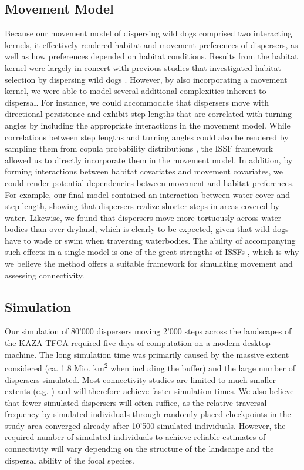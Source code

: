 \documentclass[abstract=on,10pt,a4paper,bibliography=totocnumbered]{article}
\begin{document}
\subsection{Movement Model}
Because our movement model of dispersing wild dogs comprised two interacting
kernels, it effectively rendered habitat and movement preferences of dispersers,
as well as how preferences depended on habitat conditions. Results from the
habitat kernel were largely in concert with previous studies that investigated
habitat selection by dispersing wild dogs \citep{DaviesMostert.2012,
Masenga.2016, Woodroffe.2019, Oneill.2020, Hofmann.2021}. However, by also
incorporating a movement kernel, we were able to model several additional
complexities inherent to dispersal. For instance, we could accommodate that
dispersers move with directional persistence \citep{Cozzi.2018, Hofmann.2021}
and exhibit step lengths that are correlated with turning angles
\citep{Morales.2004, Borger.2012} by including the appropriate interactions in
the movement model. While correlations between step lengths and turning angles
could also be rendered by sampling them from copula probability distributions
\citep{Hodel.2021a}, the ISSF framework allowed us to directly incorporate them
in the movement model. In addition, by forming interactions between habitat
covariates and movement covariates, we could render potential dependencies
between movement and habitat preferences. For example, our final model contained
an interaction between water-cover and step length, showing that dispersers
realize shorter steps in areas covered by water. Likewise, we found that
dispersers move more tortuously across water bodies than over dryland, which is
clearly to be expected, given that wild dogs have to wade or swim when
traversing waterbodies. The ability of accompanying such effects in a single
model is one of the great strengths of ISSFs \citep{Avgar.2016, Fieberg.2020},
which is why we believe the method offers a suitable framework for simulating
movement and assessing connectivity.

\subsection{Simulation}
Our simulation of 80'000 dispersers moving 2'000 steps across the landscapes of
the KAZA-TFCA required five days of computation on a modern desktop machine. The
long simulation time was primarily caused by the massive extent considered (ca.
1.8 Mio. km\textsuperscript{2} when including the buffer) and the large number
of dispersers simulated. Most connectivity studies are limited to much smaller
extents (e.g. \citealp{Kanagaraj.2013, Clark.2015, McClure.2016, Abrahms.2017,
Zeller.2020}) and will therefore achieve faster simulation times. We also
believe that fewer simulated dispersers will often suffice, as the relative
traversal frequency by simulated individuals through randomly placed checkpoints
in the study area converged already after 10'500 simulated individuals. However,
the required number of simulated individuals to achieve reliable estimates of
connectivity will vary depending on the structure of the landscape and the
dispersal ability of the focal species.
\end{document}
